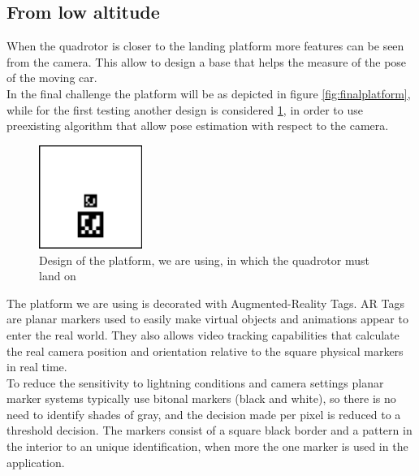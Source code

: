 \subsection{From low altitude}
When the quadrotor is closer to the landing platform more features can be seen from the camera. This allow to design a base that helps the measure of the pose of the moving car.\\
In the final challenge \label{chap:thechallenge} the platform will be as depicted in figure \ref{fig:finalplatform}, while for the first testing another design is considered \ref{fig:tempplatform}, in order to use preexisting algorithm that allow pose estimation with respect to the camera.\\
\begin{figure}[!htbp]
    \centering
    \includegraphics[width=0.3\textwidth]{img/tempbase.png}
    \caption{Design of the platform, we are using, in which the quadrotor must land on}
    \label{fig:tempplatform}
\end{figure}

The platform we are using is decorated with Augmented-Reality Tags. AR Tags are planar markers used to easily make virtual objects and animations appear to enter the real world. They also allows video tracking capabilities that calculate the real camera position and orientation relative to the square physical markers in real time. \\
To reduce the sensitivity to lightning conditions and camera settings planar marker systems typically use bitonal markers (black and white), so there is no need to identify shades of gray, and the decision made per pixel is reduced to a threshold decision. The markers consist of a square black border and a pattern in the interior to an unique identification, when more the one marker is used in the application.\\

